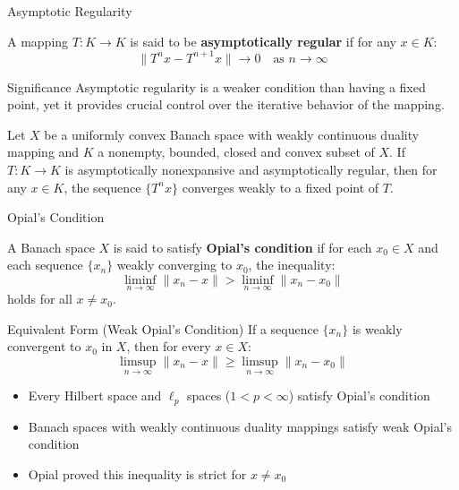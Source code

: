 \documentclass[aspectratio=169,10pt]{beamer}
\begin{document}
\begin{frame}[allowframebreaks]{Asymptotic Regularity}
    \begin{definition}[Definition 5.25]
        A mapping $T: K \to K$ is said to be \textbf{asymptotically regular} if for any $x \in K$:
        \[
        \|T^n x - T^{n+1} x\| \to 0 \quad \text{as } n \to \infty
        \]
    \end{definition}

    \begin{block}{Significance}
        Asymptotic regularity is a weaker condition than having a fixed point, yet it provides crucial control over the iterative behavior of the mapping.
    \end{block}

    \begin{theorem}[Bose, 1970]
        Let $X$ be a uniformly convex Banach space with weakly continuous duality mapping and $K$ a nonempty, bounded, closed and convex subset of $X$. If $T: K \to K$ is asymptotically nonexpansive and asymptotically regular, then for any $x \in K$, the sequence $\{T^n x\}$ converges weakly to a fixed point of $T$.
    \end{theorem}
\end{frame}

\begin{frame}[allowframebreaks]{Opial's Condition}
    \begin{definition}[Definition 5.26]
        A Banach space $X$ is said to satisfy \textbf{Opial's condition} if for each $x_0 \in X$ and each sequence $\{x_n\}$ weakly converging to $x_0$, the inequality:
        \[
        \liminf_{n \to \infty} \|x_n - x\| > \liminf_{n \to \infty} \|x_n - x_0\|
        \]
        holds for all $x \neq x_0$.
    \end{definition}

    \begin{block}{Equivalent Form (Weak Opial's Condition)}
        If a sequence $\{x_n\}$ is weakly convergent to $x_0$ in $X$, then for every $x \in X$:
        \[
        \limsup_{n \to \infty} \|x_n - x\| \ge \limsup_{n \to \infty} \|x_n - x_0\|
        \]
    \end{block}

    \begin{observation}
        \begin{itemize}
            \item Every Hilbert space and $\ell_p$ spaces ($1 < p < \infty$) satisfy Opial's condition
            \item Banach spaces with weakly continuous duality mappings satisfy weak Opial's condition
            \item Opial proved this inequality is strict for $x \neq x_0$
        \end{itemize}
    \end{observation}
\end{frame}
\end{document}
